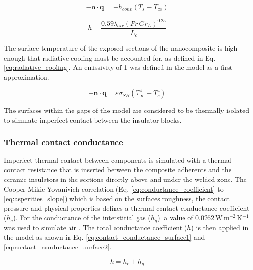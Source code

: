 \documentclass[review,times,sagev,doublespace]{sagej}
\begin{document}
\begin{equation}
-\mathbf{n} \cdot \mathbf{q} = -h_{conv} \left( T_s -T_{\infty} \right)
\label{eq:natural_convection}
\end{equation}

\begin{equation}
h = \frac{0.59 \lambda_{air} \left(Pr \ Gr_L\right)^{0.25}}{L_c}
\label{eq:convection_vertical_plate}
\end{equation}

The surface temperature of the exposed sections of the nanocomposite is high enough that radiative cooling must be accounted for, as defined in Eq. \ref{eq:radiative_cooling}.
An emissivity of 1 was defined in the model as a first approximation. 

\begin{equation}
- \mathbf{n} \cdot \mathbf{q} = \varepsilon \sigma_{SB} \left( T_{\infty}^4 - T_s^4 \right) 
\label{eq:radiative_cooling}
\end{equation}

The surfaces within the gaps of the model are considered to be thermally isolated to simulate imperfect contact between the insulator blocks.

		\subsubsection{Thermal contact conductance}

Imperfect thermal contact between components is simulated with a thermal contact resistance that is inserted between the composite adherents and the ceramic insulators in the sections directly above and under the welded zone. 
The Cooper-Mikic-Yovanivich correlation \cite{Cooper1969} (Eq. \ref{eq:conductance_coefficient} to \ref{eq:asperities_slope}) which is based on the surfaces roughness, the contact pressure and physical properties defines a thermal contact conductance coefficient ($h_c$). 
For the conductance of the interstitial gas ($h_g$), a value of \mbox{0.0262\,W\,m$^{-2}$\,K$^{-1}$} was used to simulate air \cite{rumble2019crc}. 
The total conductance coefficient ($h$) is then applied in the model as shown in Eq. \ref{eq:contact_conductance_surface1} and \ref{eq:contact_conductance_surface2}. 

\begin{equation}
h = h_c + h_g
\label{eq:conductance_coefficient}
\end{equation}
\end{document}
